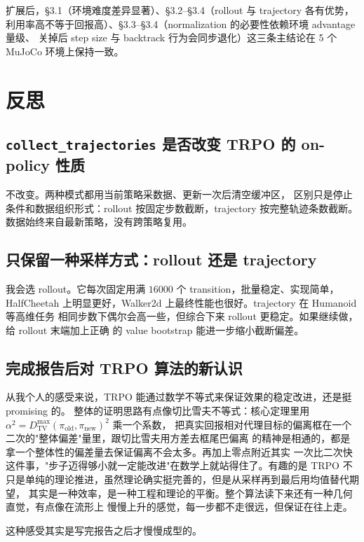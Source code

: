 \documentclass[12pt]{article}
\begin{document}
扩展后，§3.1（环境难度差异显著）、§3.2--§3.4（rollout 与 trajectory 各有优势，
利用率高不等于回报高）、§3.3--§3.4（normalization 的必要性依赖环境 advantage 量级、
关掉后 step size 与 backtrack 行为会同步退化）这三条主结论在 5 个 MuJoCo 环境上保持一致。

\section{反思}

\subsection{\texttt{collect\_trajectories} 是否改变 TRPO 的 on-policy 性质}

不改变。两种模式都用当前策略采数据、更新一次后清空缓冲区，
区别只是停止条件和数据组织形式：rollout 按固定步数截断，trajectory 按完整轨迹条数截断。
数据始终来自最新策略，没有跨策略复用。

\subsection{只保留一种采样方式：rollout 还是 trajectory}

我会选 rollout。它每次固定用满 $16000$ 个 transition，批量稳定、实现简单，
HalfCheetah 上明显更好，Walker2d 上最终性能也很好。trajectory 在 Humanoid 等高维任务
相同步数下偶尔会高一些，但综合下来 rollout 更稳定。如果继续做，给 rollout 末端加上正确
的 value bootstrap 能进一步缩小截断偏差。

\subsection{完成报告后对 TRPO 算法的新认识}

从我个人的感受来说，TRPO 能通过数学不等式来保证效果的稳定改进，还是挺 promising 的。
整体的证明思路有点像切比雪夫不等式：核心定理里用
$\alpha^2 = D_\mathrm{TV}^{\max}(\pi_\mathrm{old},\pi_\mathrm{new})^2$ 乘一个系数，
把真实回报相对代理目标的偏离框在一个二次的"整体偏差"量里，跟切比雪夫用方差去框尾巴偏离
的精神是相通的，都是拿一个整体性的偏差量去保证偏离不会太多。再加上零点附近其实
一次比二次快这件事，"步子迈得够小就一定能改进"在数学上就站得住了。有趣的是
TRPO 不只是单纯的理论推进，虽然理论确实挺完善的，但是从采样再到最后用均值替代期望，
其实是一种效率，是一种工程和理论的平衡。整个算法读下来还有一种几何直觉，有点像在流形上
慢慢上升的感觉，每一步都不走很远，但保证在往上走。

这种感受其实是写完报告之后才慢慢成型的。
\end{document}
